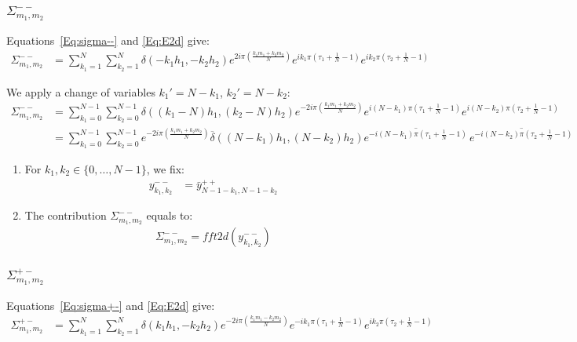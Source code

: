 \subsubsection{\texorpdfstring{$\Sigma_{m_1,m_2}^{--}$}{sigma--}}

Equations~\eqref{Eq:sigma--} and \eqref{Eq:E2d} give:
\begin{align*}
\Sigma_{m_1,m_2}^{--}&=\sum_{k_1=1}^{N}\sum_{k_2=1}^{N}\delta\left(-k_1h_1,-k_2h_2\right)
    e^{2i\pi\left(\frac{k_1m_1+k_2m_2}{N}\right)}
    e^{ik_1\pi\left(\tau_1+\frac{1}{N}-1\right)}
    e^{ik_2\pi\left(\tau_2+\frac{1}{N}-1\right)}
\end{align*}

We apply a change of variables $k_1'=N-k_1$, $k_2'=N-k_2$:
\begin{align*}
\Sigma_{m_1,m_2}^{--}&=\sum_{k_1=0}^{N-1}\sum_{k_2=0}^{N-1}
  \delta\left((k_1-N)h_1,(k_2-N)h_2\right) e^{-2i\pi\left(\frac{k_1m_1+k_2m_2}{N}\right)}
    e^{i(N-k_1)\pi\left(\tau_1+\frac{1}{N}-1\right)}
    e^{i(N-k_2)\pi\left(\tau_2+\frac{1}{N}-1\right)} \\
 &=\sum_{k_1=0}^{N-1}\sum_{k_2=0}^{N-1} e^{-2i\pi\left(\frac{k_1m_1+k_2m_2}{N}\right)} 
  \overline{\delta}\left((N-k_1)h_1,(N-k_2)h_2\right) 
    \overline{e^{-i(N-k_1)\pi\left(\tau_1+\frac{1}{N}-1\right)}}\,
    \overline{e^{-i(N-k_2)\pi\left(\tau_2+\frac{1}{N}-1\right)}}
\end{align*}

\begin{enumerate}
\item For $k_1,k_2\in\{0,\hdots,N-1\}$, we fix:
\begin{align*}
y^{--}_{k_1,k_2}&=\bar{y}^{++}_{N-1-k_1,N-1-k_2}
\end{align*}
\item The contribution $\Sigma_{m_1,m_2}^{--}$ equals to:
\begin{align*}
  \Sigma_{m_1,m_2}^{--}=fft2d(y^{--}_{k_1,k_2})
\end{align*}
\end{enumerate}

\subsubsection{\texorpdfstring{$\Sigma_{m_1,m_2}^{+-}$}{sigma+-}}

Equations~\eqref{Eq:sigma+-} and \eqref{Eq:E2d} give:
\begin{align*}
\Sigma_{m_1,m_2}^{+-}&=\sum_{k_1=1}^{N}\sum_{k_2=1}^{N}\delta\left(k_1h_1,-k_2h_2\right)
    e^{-2i\pi\left(\frac{k_1m_1-k_2m_2}{N}\right)}
    e^{-ik_1\pi\left(\tau_1+\frac{1}{N}-1\right)}
    e^{ik_2\pi\left(\tau_2+\frac{1}{N}-1\right)}
\end{align*}

